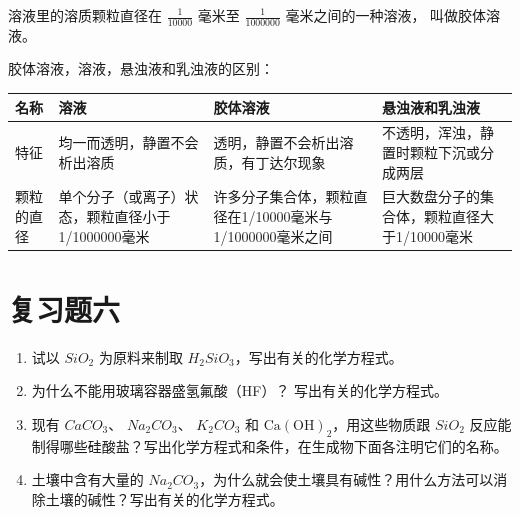 溶液里的溶质颗粒直径在 \(\frac{1}{10000}\) 毫米至 \(\frac{1}{1000000}\)
毫米之间的一种溶液， 叫做胶体溶液。

胶体溶液，溶液，悬浊液和乳浊液的区别：

{\def\LTcaptype{none} %
\begin{longtable}[]{@{}
  >{\raggedright\arraybackslash}p{}
  >{\raggedright\arraybackslash}p{}
  >{\raggedright\arraybackslash}p{}
  >{\raggedright\arraybackslash}p{}@{}}
\toprule\noalign{}
\begin{minipage}[b]{\linewidth}\raggedright
名称
\end{minipage} & \begin{minipage}[b]{\linewidth}\raggedright
溶液
\end{minipage} & \begin{minipage}[b]{\linewidth}\raggedright
胶体溶液
\end{minipage} & \begin{minipage}[b]{\linewidth}\raggedright
悬浊液和乳浊液
\end{minipage} \\
\midrule\noalign{}
\endhead
\bottomrule\noalign{}
\endlastfoot
特征 & 均一而透明，静置不会析出溶质 &
透明，静置不会析出溶质，有丁达尔现象 &
不透明，浑浊，静置时颗粒下沉或分成两层 \\
颗粒的直径 & 单个分子（或离子）状态，颗粒直径小于1/1000000毫米 &
许多分子集合体，颗粒直径在1/10000毫米与1/1000000毫米之间 &
巨大数盘分子的集合体，颗粒直径大于1/10000毫米 \\
\end{longtable}
}

\section{复习题六}

\begin{enumerate}
\item
  试以 \(SiO_{2}\) 为原料来制取 \(H_{2}SiO_{3}\)，写出有关的化学方程式。
\item
  为什么不能用玻璃容器盛氢氟酸（HF）？ 写出有关的化学方程式。
\item
  现有 \(CaCO_{3}\)、 \(Na_{2}CO_{3}\)、 \(K_{2}CO_{3}\) 和
  \(\mathrm{Ca(OH)}_{2}\)，用这些物质跟 \(SiO_{2}\)
  反应能制得哪些硅酸盐？写出化学方程式和条件，在生成物下面各注明它们的名称。
\item
  土壤中含有大量的
  \(Na_{2}CO_{3}\)，为什么就会使土壤具有碱性？用什么方法可以消除土壤的碱性？写出有关的化学方程式。
\end{enumerate}

